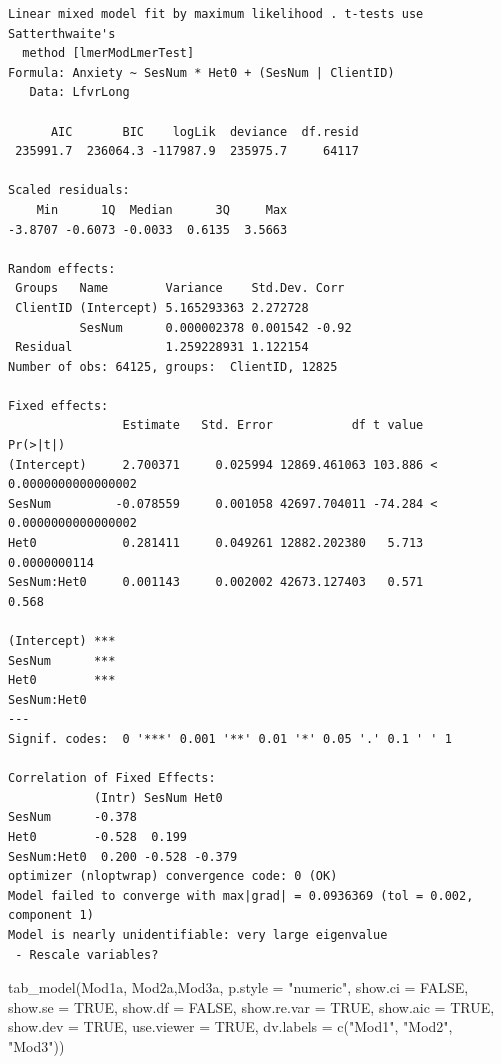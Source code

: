 \documentclass[
  english,
]{book}
\newenvironment{Shaded}{\begin{snugshade}}{\end{snugshade}}
\newcommand{\AttributeTok}[1]{\textcolor[rgb]{0.77,0.63,0.00}{#1}}
\newcommand{\ConstantTok}[1]{\textcolor[rgb]{0.00,0.00,0.00}{#1}}
\newcommand{\FunctionTok}[1]{\textcolor[rgb]{0.00,0.00,0.00}{#1}}
\newcommand{\NormalTok}[1]{#1}
\newcommand{\StringTok}[1]{\textcolor[rgb]{0.31,0.60,0.02}{#1}}
\begin{document}
\begin{verbatim}
Linear mixed model fit by maximum likelihood . t-tests use Satterthwaite's
  method [lmerModLmerTest]
Formula: Anxiety ~ SesNum * Het0 + (SesNum | ClientID)
   Data: LfvrLong

      AIC       BIC    logLik  deviance  df.resid 
 235991.7  236064.3 -117987.9  235975.7     64117 

Scaled residuals: 
    Min      1Q  Median      3Q     Max 
-3.8707 -0.6073 -0.0033  0.6135  3.5663 

Random effects:
 Groups   Name        Variance    Std.Dev. Corr 
 ClientID (Intercept) 5.165293363 2.272728      
          SesNum      0.000002378 0.001542 -0.92
 Residual             1.259228931 1.122154      
Number of obs: 64125, groups:  ClientID, 12825

Fixed effects:
                Estimate   Std. Error           df t value             Pr(>|t|)
(Intercept)     2.700371     0.025994 12869.461063 103.886 < 0.0000000000000002
SesNum         -0.078559     0.001058 42697.704011 -74.284 < 0.0000000000000002
Het0            0.281411     0.049261 12882.202380   5.713         0.0000000114
SesNum:Het0     0.001143     0.002002 42673.127403   0.571                0.568
               
(Intercept) ***
SesNum      ***
Het0        ***
SesNum:Het0    
---
Signif. codes:  0 '***' 0.001 '**' 0.01 '*' 0.05 '.' 0.1 ' ' 1

Correlation of Fixed Effects:
            (Intr) SesNum Het0  
SesNum      -0.378              
Het0        -0.528  0.199       
SesNum:Het0  0.200 -0.528 -0.379
optimizer (nloptwrap) convergence code: 0 (OK)
Model failed to converge with max|grad| = 0.0936369 (tol = 0.002, component 1)
Model is nearly unidentifiable: very large eigenvalue
 - Rescale variables?
\end{verbatim}

\begin{Shaded}
\begin{Highlighting}[]
\FunctionTok{tab\_model}\NormalTok{(Mod1a, Mod2a,Mod3a, }\AttributeTok{p.style =} \StringTok{"numeric"}\NormalTok{, }\AttributeTok{show.ci =} \ConstantTok{FALSE}\NormalTok{, }\AttributeTok{show.se =} \ConstantTok{TRUE}\NormalTok{, }\AttributeTok{show.df =} \ConstantTok{FALSE}\NormalTok{, }\AttributeTok{show.re.var =} \ConstantTok{TRUE}\NormalTok{, }\AttributeTok{show.aic =} \ConstantTok{TRUE}\NormalTok{, }\AttributeTok{show.dev =} \ConstantTok{TRUE}\NormalTok{, }\AttributeTok{use.viewer =} \ConstantTok{TRUE}\NormalTok{, }\AttributeTok{dv.labels =} \FunctionTok{c}\NormalTok{(}\StringTok{"Mod1"}\NormalTok{, }\StringTok{"Mod2"}\NormalTok{, }\StringTok{"Mod3"}\NormalTok{))}
\end{Highlighting}
\end{Shaded}
\end{document}
